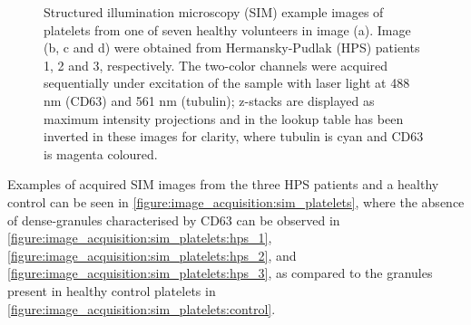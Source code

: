 \begin{figure}[htbp]\centering
	\begin{subfigure}[b]{0.49\linewidth}
		\centering
		\caption{}
		\label{figure:image_acquisition:sim_platelets:control}
	\end{subfigure}
	\begin{subfigure}[b]{0.49\linewidth}
		\centering
		\caption{}
		\label{figure:image_acquisition:sim_platelets:hps_1}
	\end{subfigure}
	\begin{subfigure}[b]{0.49\linewidth}
		\centering
		\caption{}
		\label{figure:image_acquisition:sim_platelets:hps_2}
	\end{subfigure}
	\begin{subfigure}[b]{0.49\linewidth}
		\centering
		\caption{}
		\label{figure:image_acquisition:sim_platelets:hps_3}
	\end{subfigure}
	\caption[Structured illumination microscopy images of platelets]{Structured illumination microscopy (SIM) example images of platelets from one of seven healthy volunteers in image (a). Image (b, c and d) were obtained from Hermansky-Pudlak (HPS) patients 1, 2 and 3, respectively. The two-color channels were acquired sequentially under excitation of the sample with laser light at 488 nm (CD63) and 561 nm (tubulin); z-stacks are displayed as maximum intensity projections and in the lookup table has been inverted in these images for clarity, where tubulin is cyan and CD63 is magenta coloured.}
	\label{figure:image_acquisition:sim_platelets}
\end{figure}

Examples of acquired SIM images from the three HPS patients and a healthy control can be seen in \autoref{figure:image_acquisition:sim_platelets}, where the absence of dense-granules characterised by CD63 can be observed in \autoref{figure:image_acquisition:sim_platelets:hps_1}, \autoref{figure:image_acquisition:sim_platelets:hps_2}, and \autoref{figure:image_acquisition:sim_platelets:hps_3}, as compared to the granules present in healthy control platelets in \autoref{figure:image_acquisition:sim_platelets:control}.


